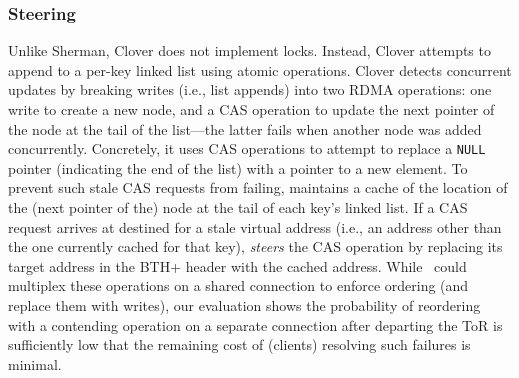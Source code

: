 \subsubsection{Steering}
Unlike Sherman, Clover does not implement locks.  Instead, Clover
attempts to append to a per-key linked list using atomic operations.
Clover detects concurrent updates by breaking writes (i.e., list
appends) into two RDMA operations: one write to create a new node, and
a CAS operation to update the next pointer of the node at the tail of
the list---the latter fails when another node was added concurrently.
Concretely, it uses CAS operations to attempt to replace a
\texttt{NULL} pointer (indicating the end of the list) with a pointer
to a new element.  To prevent such stale CAS requests from failing,
{\sword} maintains a cache of the location of the (next pointer of
the) node at the tail of each key's linked list. If a CAS request
arrives at {\sword} destined for a stale virtual address (i.e., an
address other than the one currently cached for that key), {\sword}
\emph{steers} the CAS operation by replacing its target address in the
BTH+ header with the cached address.
While \sword\ could multiplex these operations on a shared connection
to enforce ordering (and replace them with writes), our evaluation
shows the probability of reordering with a contending operation on a
separate connection after departing the ToR is sufficiently low that
the remaining cost of (clients) resolving such failures is minimal.





